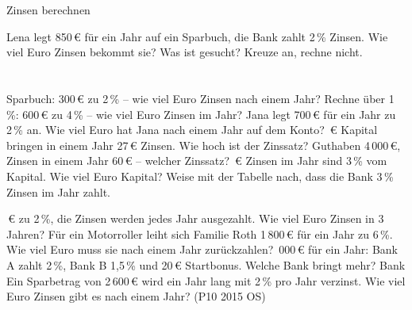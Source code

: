 \setcounter{aufgabe}{10}

\begin{aufgabe}{Zinsen berechnen}
\begin{teile}
\teil Lena legt 850\,€ für ein Jahr auf ein Sparbuch, die Bank zahlt 2\,\% Zinsen. Wie viel Euro Zinsen bekommt sie? Was ist gesucht? Kreuze an, rechne nicht. \\  \\  \\ 
\teil Sparbuch: 300\,€ zu 2\,\% – wie viel Euro Zinsen nach einem Jahr? \leerfeld[€]
\teil Rechne über 1\,\%: 600\,€ zu 4\,\% – wie viel Euro Zinsen im Jahr? \leerfeld[€]
\teil Jana legt 700\,€ für ein Jahr zu 2\,\% an. Wie viel Euro hat Jana nach einem Jahr auf dem Konto? \leerfeld[€]
\,€ Kapital bringen in einem Jahr 27\,€ Zinsen. Wie hoch ist der Zinssatz? \leerfeld[\%]
\teil Guthaben 4\,000\,€, Zinsen in einem Jahr 60\,€ – welcher Zinssatz? \leerfeld[\%]
\,€ Zinsen im Jahr sind 3\,\% vom Kapital. Wie viel Euro Kapital? \leerfeld[€]
\teil Weise mit der Tabelle nach, dass die Bank 3\,\% Zinsen im Jahr zahlt.

\,€ zu 2\,\%, die Zinsen werden jedes Jahr ausgezahlt. Wie viel Euro Zinsen in 3 Jahren? \leerfeld[€]
\teil Für ein Motorroller leiht sich Familie Roth 1\,800\,€ für ein Jahr zu 6\,\%. Wie viel Euro muss sie nach einem Jahr zurückzahlen? \leerfeld[€]
\,000\,€ für ein Jahr: Bank A zahlt 2\,\%, Bank B 1,5\,\% und 20\,€ Startbonus. Welche Bank bringt mehr? Bank \leerfeld
\teil Ein Sparbetrag von 2\,600\,€ wird ein Jahr lang mit 2\,\% pro Jahr verzinst. Wie viel Euro Zinsen gibt es nach einem Jahr? \hfill (P10 2015 OS) \\ \leerfeld[€]
\end{teile}
\end{aufgabe}

